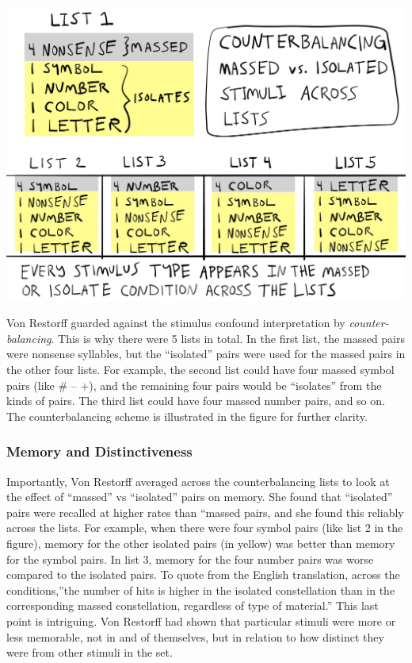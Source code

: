 \documentclass[
  oneside,
  12pt]{crumpbook}
\newenvironment{floatright50}{%
  \wrapfigure{R}{.5\textwidth}%
  }{%
  \endwrapfigure}
\begin{document}
\begin{floatright50}
\includegraphics[width=1\linewidth]{imgs/Von_Restorff_counterbalance}

\end{floatright50}

Von Restorff guarded against the stimulus confound interpretation by \emph{counter-balancing}. This is why there were 5 lists in total. In the first list, the massed pairs were nonsense syllables, but the ``isolated'' pairs were used for the massed pairs in the other four lists. For example, the second list could have four massed symbol pairs (like \# -- +), and the remaining four pairs would be ``isolates'' from the kinds of pairs. The third list could have four massed number pairs, and so on. The counterbalancing scheme is illustrated in the figure for further clarity.

\hypertarget{memory-and-distinctiveness}{%
\subsubsection{Memory and Distinctiveness}\label{memory-and-distinctiveness}}

Importantly, Von Restorff averaged across the counterbalancing lists to look at the effect of ``massed'' vs ``isolated'' pairs on memory. She found that ``isolated'' pairs were recalled at higher rates than ``massed pairs, and she found this reliably across the lists. For example, when there were four symbol pairs (like list 2 in the figure), memory for the other isolated pairs (in yellow) was better than memory for the symbol pairs. In list 3, memory for the four number pairs was worse compared to the isolated pairs. To quote from the English translation, across the conditions,''the number of hits is higher in the isolated constellation than in the corresponding massed constellation, regardless of type of material.'' This last point is intriguing. Von Restorff had shown that particular stimuli were more or less memorable, not in and of themselves, but in relation to how distinct they were from other stimuli in the set.
\end{document}
